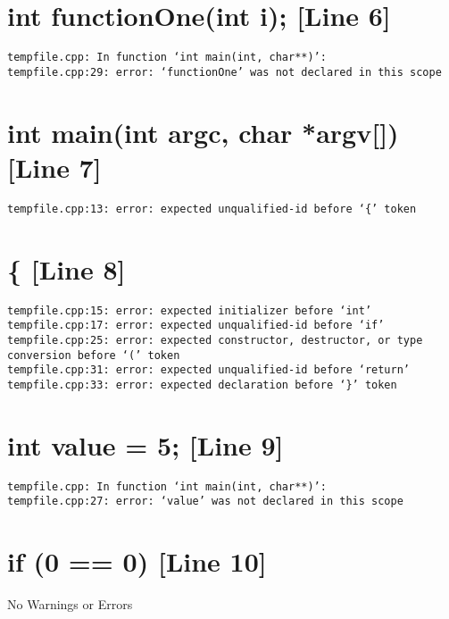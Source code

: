 \documentclass{article}
\begin{document}
\section{int functionOne(int i); [Line 6]}
\begin{verbatim}
tempfile.cpp: In function ‘int main(int, char**)’:
tempfile.cpp:29: error: ‘functionOne’ was not declared in this scope

\end{verbatim}



\section{int main(int argc, char *argv[]) [Line 7]}
\begin{verbatim}
tempfile.cpp:13: error: expected unqualified-id before ‘{’ token

\end{verbatim}



\section{\{ [Line 8]}
\begin{verbatim}
tempfile.cpp:15: error: expected initializer before ‘int’
tempfile.cpp:17: error: expected unqualified-id before ‘if’
tempfile.cpp:25: error: expected constructor, destructor, or type conversion before ‘(’ token
tempfile.cpp:31: error: expected unqualified-id before ‘return’
tempfile.cpp:33: error: expected declaration before ‘}’ token

\end{verbatim}



\section{int value = 5; [Line 9]}
\begin{verbatim}
tempfile.cpp: In function ‘int main(int, char**)’:
tempfile.cpp:27: error: ‘value’ was not declared in this scope

\end{verbatim}



\section{if (0 == 0) [Line 10]}
No Warnings or Errors
\end{document}
